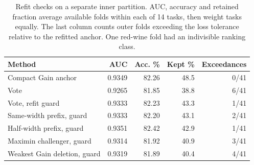 \begin{table}[tb]
\centering
\caption{Refit checks on a separate inner partition. AUC, accuracy and retained fraction average available folds within each of 14 tasks, then weight tasks equally. The last column counts outer folds exceeding the loss tolerance relative to the refitted anchor. One red-wine fold had an indivisible ranking class.}
\label{tab:adjudication}
\small
\begin{tabular}{@{}lrrrr@{}}
\toprule
Method & AUC & Acc. \% & Kept \% & Exceedances \\
\midrule
Compact Gain anchor & 0.9349 & 82.26 & 48.5 & 0/41 \\
Vote & 0.9265 & 81.85 & 38.8 & 6/41 \\
Vote, refit guard & 0.9333 & 82.23 & 43.3 & 1/41 \\
Same-width prefix, guard & 0.9333 & 82.20 & 43.1 & 2/41 \\
Half-width prefix, guard & 0.9351 & 82.42 & 42.9 & 1/41 \\
Maximin challenger, guard & 0.9314 & 81.92 & 40.9 & 3/41 \\
Weakest Gain deletion, guard & 0.9319 & 81.89 & 40.4 & 4/41 \\
\bottomrule
\end{tabular}
\end{table}
